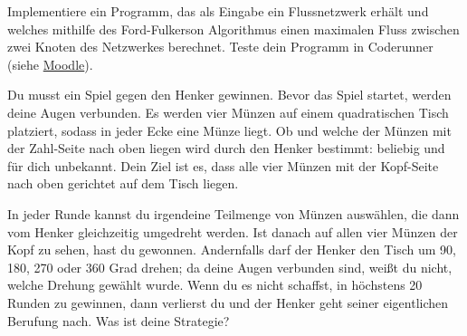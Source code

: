 \documentclass{uebung_cs}
\begin{document}
\begin{aufgabe}
    Implementiere ein Programm, das als Eingabe ein Flussnetzwerk erhält und welches mithilfe des Ford-Fulkerson Algorithmus einen maximalen Fluss zwischen zwei Knoten des Netzwerkes berechnet.
    Teste dein Programm in Coderunner (siehe \href{https://moodle.studiumdigitale.uni-frankfurt.de/moodle/course/view.php?id=2241}{Moodle}).
\end{aufgabe}

\begin{aufgabe}
    Du musst ein Spiel gegen den Henker gewinnen. Bevor das Spiel startet, werden deine Augen verbunden. Es werden vier Münzen auf einem quadratischen Tisch platziert, sodass in jeder Ecke eine Münze liegt. Ob und welche der Münzen mit der Zahl-Seite nach oben liegen wird durch den Henker bestimmt: beliebig und für dich unbekannt. Dein Ziel ist es, dass alle vier Münzen mit der Kopf-Seite nach oben gerichtet auf dem Tisch liegen.
    
    In jeder Runde kannst du irgendeine Teilmenge von Münzen auswählen, die dann vom Henker gleichzeitig umgedreht werden. Ist danach auf allen vier Münzen der Kopf zu sehen, hast du gewonnen. Andernfalls darf der Henker den Tisch um 90, 180, 270 oder 360 Grad drehen; da deine Augen verbunden sind, weißt du nicht, welche Drehung gewählt wurde. Wenn du es nicht schaffst, in höchstens 20 Runden zu gewinnen, dann verlierst du und der Henker geht seiner eigentlichen Berufung nach. Was ist deine Strategie?
\end{aufgabe}
\end{document}
